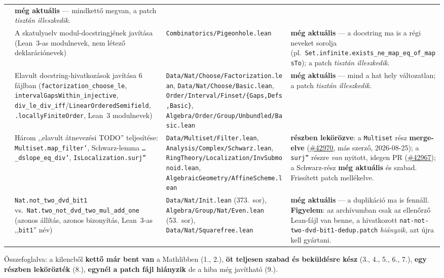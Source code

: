 \documentclass[11pt,a4paper]{article}
\newcommand{\lean}[1]{\texttt{\small #1}}
\newcommand{\bk}{\allowbreak}
\newcommand{\pr}[1]{\href{https://github.com/leanprover-community/mathlib4/pull/#1}{\##1}}
\newcommand{\OK}{\textcolor{green!45!black}{\textbf{merge-elve}}}
\newcommand{\EL}{\textcolor{blue!55!black}{\textbf{még aktuális}}}
\begin{document}
\begin{longtable}{@{}>{\raggedright\arraybackslash}p{0.45cm}>{\raggedright\arraybackslash}p{4.4cm}>{\raggedright\arraybackslash}p{4.2cm}>{\raggedright\arraybackslash}p{5.2cm}@{}}
  & \EL{} --- mindkettő megvan, a patch \emph{tisztán illeszkedik}.\\
\addlinespace
6 & A skatulyaelv modul-docstringjének javítása (Lean~3-as modulnevek, nem létező deklarációnevek)
  & \lean{Combinatorics/\bk Pigeonhole.\bk lean}
  & \EL{} --- a docstring ma is a régi neveket sorolja (pl.\ \lean{Set.\bk infinite.\bk exists\_\bk ne\_\bk map\_\bk eq\_\bk of\_\bk mapsTo}); a patch \emph{tisztán illeszkedik}.\\
\addlinespace
7 & Elavult docstring-hivatkozások javítása 6 fájlban (\lean{factorization\_\bk choose\_\bk le}, \lean{interval\bk Gaps\bk Within\_\bk injective}, \lean{div\_\bk le\_\bk div\_\bk iff}/\lean{Linear\bk Ordered\bk Semifield}, \lean{*.\bk locallyFiniteOrder}, Lean~3 modulnevek)
  & \lean{Data/\bk Nat/\bk Choose/\bk Factorization.\bk lean}, \lean{Data/\bk Nat/\bk Choose/\bk Basic.\bk lean}, \lean{Order/\bk Interval/\bk Finset/\bk \{Gaps,\bk Defs,\bk Basic\}}, \lean{Algebra/\bk Order/\bk Group/\bk Unbundled/\bk Basic.\bk lean}
  & \EL{} --- mind a hat hely változatlan; a patch \emph{tisztán illeszkedik}.\\
\addlinespace
8 & Három ,,elavult átnevezési TODO'' teljesítése: \lean{Multiset.\bk map\_\bk filter'}, Schwarz-lemma \lean{\dots\_\bk dslope\_\bk eq\_\bk div'}, \lean{IsLocalization.\bk surj''}
  & \lean{Data/\bk Multiset/\bk Filter.\bk lean}, \lean{Analysis/\bk Complex/\bk Schwarz.\bk lean}, \lean{RingTheory/\bk Localization/\bk InvSubmonoid.\bk lean}, \lean{AlgebraicGeometry/\bk AffineScheme.\bk lean}
  & \textbf{részben lekörözve}: a \lean{Multiset} rész \OK{} (\pr{42970}, más szerző, 2026-08-25); a \lean{surj''} részre \emph{van} nyitott, idegen PR (\pr{42967}); a Schwarz-rész \EL{} és szabad. Frissített patch mellékelve.\\
\addlinespace
9 & \lean{Nat.\bk not\_\bk two\_\bk dvd\_\bk bit1} vs.\ \lean{Nat.\bk two\_\bk not\_\bk dvd\_\bk two\_\bk mul\_\bk add\_\bk one} (azonos állítás, azonos bizonyítás, Lean~3-as ,,\lean{bit1}'' név)
  & \lean{Data/\bk Nat/\bk Init.\bk lean} (373.\ sor), \lean{Algebra/\bk Group/\bk Nat/\bk Even.\bk lean} (53.\ sor), \lean{Data/\bk Nat/\bk Squarefree.\bk lean}
  & \EL{} --- a duplikáció ma is fennáll. \textbf{Figyelem}: az archívumban csak az ellenőrző Lean-fájl van benne, a hivatkozott \lean{nat-not-two-dvd-bit1-dedup.\bk patch} \emph{hiányzik}, azt újra kell gyártani.\\
\end{longtable}
\endgroup

\medskip
\noindent
Összefoglalva: a kilencből \textbf{kettő már bent van} a Mathlibben (1., 2.),
\textbf{öt teljesen szabad és beküldésre kész} (3., 4., 5., 6., 7.),
\textbf{egy részben lekörözték} (8.), \textbf{egynél a patch fájl hiányzik}
de a hiba még javítható (9.).
\end{document}
